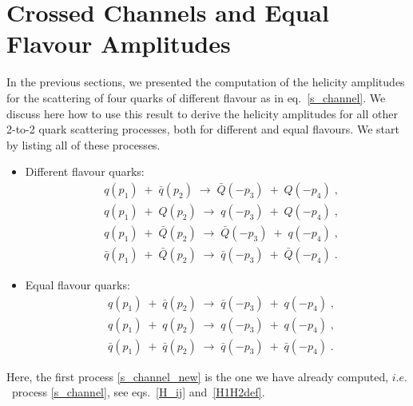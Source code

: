 
\section{Crossed Channels and Equal Flavour Amplitudes} \label{extra_results}
In the previous sections, we presented the computation of the helicity amplitudes 
for the scattering of four quarks of different flavour as in eq.~\eqref{s_channel}.  
We discuss here how to use this result to derive the helicity amplitudes for all other 2-to-2 quark scattering processes, both for different and equal flavours.
We start by listing all of these processes.
\begin{itemize}
\item Different flavour quarks:
 \begin{align}
 & { q}(p_1) \;+ \;\bar { q}(p_2)  \; \longrightarrow \;  { \bar Q}(-p_3) \;+ \; {   Q}(-p_4) \; ,    \label{s_channel_new} \\[8pt]
&  { q}(p_1) \;+ \; { Q}(p_2)  \; \longrightarrow \;  {  q}(-p_3) \;+ \; {   Q}(-p_4) \; ,  \label{t_channel}   \\[8pt]
& { q}(p_1) \;+ \;\bar { Q}(p_2)  \; \longrightarrow \;  { \bar Q}(-p_3) \;+ \;{ q}(-p_4)  \; ,\label{u_channel} \\[8pt]
&  { \bar q}(p_1) \;+ \; { \bar Q}(p_2)  \; \longrightarrow \;  { \bar q}(-p_3) \;+ \; {  \bar  Q}(-p_4) \; .  \label{anti_t_channel} 
 \end{align}
 \item Equal flavour quarks:
\begin{align}
 & { q}(p_1) \;+ \;\bar { q}(p_2)  \; \longrightarrow \;  { \bar q}(-p_3) \;+ \; {   q}(-p_4) \; ,    \label{s_channel_equal} \\[8pt]
 & { q}(p_1) \;+ \; { q}(p_2)  \; \longrightarrow \;  {  q}(-p_3) \;+ \; {  q}(-p_4) \; ,  \label{t_channel_equal}  \\[8pt]
  & { \bar q}(p_1) \;+ \; { \bar q}(p_2)  \; \longrightarrow \;  { \bar  q}(-p_3) \;+ \; { \bar  q}(-p_4) \; .  \label{anti_t_channel_equal}  
\end{align}
\end{itemize}
Here, the first process \eqref{s_channel_new} is the one we have already computed,  
$i.e.$\ process \eqref{s_channel}, see eqs.~\eqref{H_ij} and~\eqref{H1H2def}.

